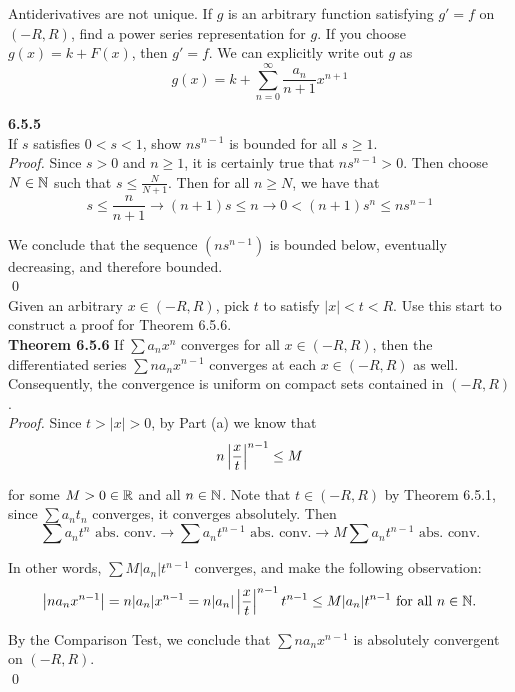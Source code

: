 \documentclass{exam}
\begin{document}
\begin{questions}
Antiderivatives are not unique. If $g$ is an arbitrary function satisfying $g' = f$ on $(-R, R)$, find a power series representation for $g$.
\sol
If you choose $g(x) = k + F(x)$, then $g' = f$. We can explicitly write out $g$ as
$$g(x) = k + \sum_{n = 0}^\infty \frac{a_n}{n + 1}x^{n + 1}$$

\newpage
\textbf{6.5.5 } \\
If $s$ satisfies $0 < s < 1$, show $ns^{n - 1}$ is bounded for all $s \geq 1$. \\
\textit{Proof. }
Since $s > 0$ and $n \geq 1$, it is certainly true that $ns^{n - 1} > 0$. Then choose $N \in \mathbb {N}$ such that $s \leq \frac{N}{N + 1}$. Then for all $n \geq N$, we have that
$$s\leq \frac{n}{n + 1} \rightarrow (n + 1)s \leq n \rightarrow 0 < (n + 1)s^{n} \leq ns^{n - 1}$$

We conclude that the sequence $(ns^{n - 1})$ is bounded below, eventually decreasing, and therefore bounded.
\\ \qed \\

Given an arbitrary $x \in (-R, R)$, pick $t$ to satisfy $|x| < t < R$. Use this start to construct a proof for Theorem 6.5.6. \\
\textbf{Theorem 6.5.6 }
If $\sum a_nx^n$ converges for all $x\in (-R, R)$, then the differentiated series $\sum na_nx^{n - 1}$ converges at each $x\in (-R, R)$ as well. Consequently, the convergence is uniform on compact sets contained in $(-R, R)$. \\
\textit{Proof. }
Since $t > |x| > 0$, by Part (a) we know that
$$n\left| \frac{x}{t} \right|^{n - 1} \leq M$$

for some $M > 0 \in \mathbb {R}$ and all $n \in \mathbb {N}$. Note that $t\in (-R, R)$ by Theorem 6.5.1, since $\sum a_n t_n$ converges, it converges absolutely. Then
$$\sum a_nt^n \text{ abs. conv.}\longrightarrow \sum a_n t^{n - 1}\text{ abs. conv.} \longrightarrow M\sum a_nt^{n - 1}\text{ abs. conv.}$$

In other words, $\sum M|a_n|t^{n - 1}$ converges, and make the following observation:
$$\left| na_nx^{n - 1} \right| = n|a_n|x^{n - 1} = n|a_n|\left| \frac{x}{t} \right|^{n - 1}t^{n - 1} \leq M|a_n|t^{n - 1}\text{ for all } n\in \mathbb {N}.$$

By the Comparison Test, we conclude that $\sum na_nx^{n - 1}$ is absolutely convergent on $(-R, R)$.
\\ \qed \\
\end{questions}
\end{document}
